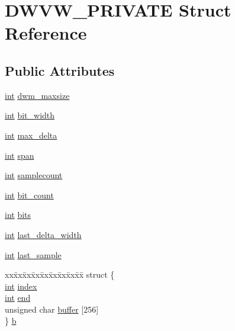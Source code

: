\hypertarget{struct_d_w_v_w___p_r_i_v_a_t_e}{}\section{D\+W\+V\+W\+\_\+\+P\+R\+I\+V\+A\+TE Struct Reference}
\label{struct_d_w_v_w___p_r_i_v_a_t_e}
\subsection*{Public Attributes}
\begin{DoxyCompactItemize}
\item 
\hyperlink{xmltok_8h_a5a0d4a5641ce434f1d23533f2b2e6653}{int} \hyperlink{struct_d_w_v_w___p_r_i_v_a_t_e_a95dce51766d3f243a6c99c3bcd2f18a2}{dwm\+\_\+maxsize}
\item 
\hyperlink{xmltok_8h_a5a0d4a5641ce434f1d23533f2b2e6653}{int} \hyperlink{struct_d_w_v_w___p_r_i_v_a_t_e_a52a90f5ed503dfa5661ce3901f85428e}{bit\+\_\+width}
\item 
\hyperlink{xmltok_8h_a5a0d4a5641ce434f1d23533f2b2e6653}{int} \hyperlink{struct_d_w_v_w___p_r_i_v_a_t_e_a69752e0dacba092d81a8eb9aaa084361}{max\+\_\+delta}
\item 
\hyperlink{xmltok_8h_a5a0d4a5641ce434f1d23533f2b2e6653}{int} \hyperlink{struct_d_w_v_w___p_r_i_v_a_t_e_a23a7fbd234b70e868f1f0708671d2dc5}{span}
\item 
\hyperlink{xmltok_8h_a5a0d4a5641ce434f1d23533f2b2e6653}{int} \hyperlink{struct_d_w_v_w___p_r_i_v_a_t_e_af865bfccc1821f21159c948656869b32}{samplecount}
\item 
\hyperlink{xmltok_8h_a5a0d4a5641ce434f1d23533f2b2e6653}{int} \hyperlink{struct_d_w_v_w___p_r_i_v_a_t_e_ac7e60a83a1f336bd6619bebc278b6f39}{bit\+\_\+count}
\item 
\hyperlink{xmltok_8h_a5a0d4a5641ce434f1d23533f2b2e6653}{int} \hyperlink{struct_d_w_v_w___p_r_i_v_a_t_e_a160ef4d374979683ae4132f093f47552}{bits}
\item 
\hyperlink{xmltok_8h_a5a0d4a5641ce434f1d23533f2b2e6653}{int} \hyperlink{struct_d_w_v_w___p_r_i_v_a_t_e_a18a3aa36273d607e568b4d61e725cb5d}{last\+\_\+delta\+\_\+width}
\item 
\hyperlink{xmltok_8h_a5a0d4a5641ce434f1d23533f2b2e6653}{int} \hyperlink{struct_d_w_v_w___p_r_i_v_a_t_e_af6f262767c5ecfce02eac59d263d3efb}{last\+\_\+sample}
\item 
\begin{tabbing}
xx\=xx\=xx\=xx\=xx\=xx\=xx\=xx\=xx\=\kill
struct \{\\
\>\hyperlink{xmltok_8h_a5a0d4a5641ce434f1d23533f2b2e6653}{int} \hyperlink{struct_d_w_v_w___p_r_i_v_a_t_e_a0d919a53fe2f46ccd0823a684d42388e}{index}\\
\>\hyperlink{xmltok_8h_a5a0d4a5641ce434f1d23533f2b2e6653}{int} \hyperlink{struct_d_w_v_w___p_r_i_v_a_t_e_ae13ae688a730d817b60480d55f5f114c}{end}\\
\>unsigned char \hyperlink{struct_d_w_v_w___p_r_i_v_a_t_e_a45832e24e4f37217252e676499dbde40}{buffer} \mbox{[}256\mbox{]}\\
\} \hyperlink{struct_d_w_v_w___p_r_i_v_a_t_e_aadf9e9830f9db1a95c9239b09bcffe5c}{b}\\


\end{tabbing}
\end{DoxyCompactItemize}

